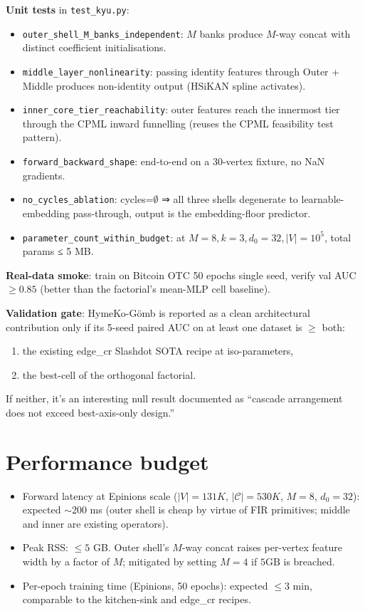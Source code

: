 \documentclass[11pt]{article}
\begin{document}
\textbf{Unit tests} in \texttt{test\_kyu.py}:
\begin{itemize}
  \item \texttt{outer\_shell\_M\_banks\_independent}: $M$ banks
    produce $M$-way concat with distinct coefficient initialisations.
  \item \texttt{middle\_layer\_nonlinearity}: passing identity
    features through Outer + Middle produces non-identity output
    (HSiKAN spline activates).
  \item \texttt{inner\_core\_tier\_reachability}: outer features
    reach the innermost tier through the CPML inward funnelling
    (reuses the CPML feasibility test pattern).
  \item \texttt{forward\_backward\_shape}: end-to-end on a 30-vertex
    fixture, no NaN gradients.
  \item \texttt{no\_cycles\_ablation}: cycles=$\emptyset$ ⇒ all three
    shells degenerate to learnable-embedding pass-through, output
    is the embedding-floor predictor.
  \item \texttt{parameter\_count\_within\_budget}: at $M=8, k=3,
    d_0=32, |V|=10^5$, total params ≤ 5 MB.
\end{itemize}

\textbf{Real-data smoke}: train on Bitcoin OTC 50 epochs single
seed, verify val AUC $\ge 0.85$ (better than the factorial's
mean-MLP cell baseline).

\textbf{Validation gate}: HymeKo-Gömb is reported as a clean
architectural contribution only if its 5-seed paired AUC on at
least one dataset is $\ge$ both:
\begin{enumerate}
  \item the existing edge\_cr Slashdot SOTA recipe at iso-parameters,
  \item the best-cell of the orthogonal factorial.
\end{enumerate}
If neither, it's an interesting null result documented as ``cascade
arrangement does not exceed best-axis-only design.''

\section{Performance budget}

\begin{itemize}
  \item Forward latency at Epinions scale ($|V| = 131K$,
    $|\mathcal{C}| = 530K$, $M = 8$, $d_0 = 32$): expected
    $\sim 200$ ms (outer shell is cheap by virtue of FIR primitives;
    middle and inner are existing operators).
  \item Peak RSS: $\le 5$ GB. Outer shell's $M$-way concat raises
    per-vertex feature width by a factor of $M$; mitigated by
    setting $M = 4$ if $5 \text{GB}$ is breached.
  \item Per-epoch training time (Epinions, 50 epochs): expected
    $\le 3$ min, comparable to the kitchen-sink and edge\_cr recipes.
\end{itemize}
\end{document}
